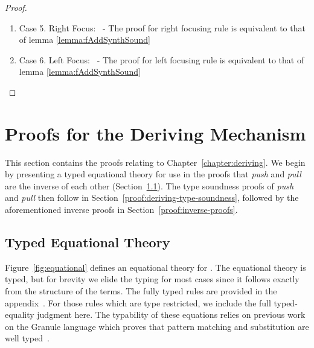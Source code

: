 \begin{proof}
\begin{enumerate}
\begin{enumerate}
\[          \]
          from case 4 of the lemma. By induction on the second premise, we have that:
          \[
            [[G |- A =>+ t2 ; D2 ]] \tag{ih2}
          \]
          from case 3 of the lemma. From which, we can construct the following instantiation of the \addPruningAppName\ synthesis rule in the non-focusing calculus:
          \[
\inferrule*[right=$\multimap_{\textsc{L}}^{\pm}$]
    {[[G, x2 : B |- C =>+ t1 ; D1, x2 : B]] \\ [[G - D1 |- A =>+ t2 ; D2 ]]}{[[G, x1 : A -o B |- C =>+
    [(x1 t2) / x2] t1 ; (D1 + D2), x1 : A -o B]] }
          \]
      \end{enumerate}
    \item Case 5. Right Focus: \fAddFocusRName\ - The proof for right focusing rule is equivalent to that of lemma \eqref{lemma:fAddSynthSound}\\
    \item Case 6. Left Focus: \fAddFocusLName\ - The proof for left focusing rule is equivalent to that of lemma \eqref{lemma:fAddSynthSound}\\
  \end{enumerate}
\end{proof}

\section{Proofs for the Deriving Mechanism}
This section contains the proofs relating to Chapter~\ref{chapter:deriving}. We begin 
by presenting a typed equational theory for use in the proofs that \emph{push} and 
\emph{pull} are the inverse of each other (Section~\ref{sec:typed-eq}). The type soundness proofs 
of \emph{push} and \emph{pull} then follow in Section~\ref{proof:deriving-type-soundness}, followed by the aforementioned 
inverse proofs in Section~\ref{proof:inverse-proofs}.

\subsection{Typed Equational Theory}
\label{sec:typed-eq}

Figure~\ref{fig:equational} defines an equational theory for
\grminip{}. The equational theory is typed, but for brevity we elide
the typing for most cases since it follows
exactly from the structure of the terms. The fully typed
 rules are provided in the appendix~\cite{appendix}. For
those rules which are type restricted, we include the full
typed-equality judgment here. The typability of these equations relies on previous work on the Granule language which proves that pattern matching and substitution are well typed~\cite{DBLP:journals/pacmpl/OrchardLE19}.

